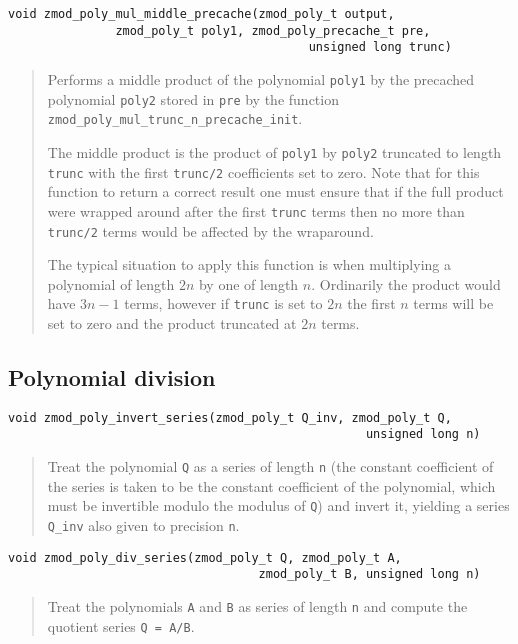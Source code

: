 \documentclass[a4paper,10pt]{article}
\newcommand{\code}{\lstinline}
\begin{document}
\begin{lstlisting}
void zmod_poly_mul_middle_precache(zmod_poly_t output,
               zmod_poly_t poly1, zmod_poly_precache_t pre,
                                          unsigned long trunc)
\end{lstlisting}
\begin{quote}
Performs a middle product of the polynomial \code{poly1} by the precached polynomial \code{poly2} stored in \code{pre} by the function \code{zmod_poly_mul_trunc_n_precache_init}. 

The middle product is the product of \code{poly1} by \code{poly2} truncated to length \code{trunc} with the first \code{trunc/2} coefficients set to zero. Note that for this function to return a correct result one must ensure that if the full product were wrapped around after the first \code{trunc} terms then no more than \code{trunc/2} terms would be affected by the wraparound. 

The typical situation to apply this function is when multiplying a polynomial of length $2n$ by one of length $n$. Ordinarily the product would have $3n - 1$ terms, however if \code{trunc} is set to $2n$ the first $n$ terms will be set to zero and the product truncated at $2n$ terms.  
\end{quote}

\subsection{Polynomial division}
\begin{lstlisting}
void zmod_poly_invert_series(zmod_poly_t Q_inv, zmod_poly_t Q, 
                                                  unsigned long n)
\end{lstlisting}
\begin{quote}
Treat the polynomial \code{Q} as a series of length \code{n} (the constant coefficient of the series is taken to be the constant coefficient of the polynomial, which must be invertible modulo the modulus of \code{Q}) and invert it, yielding a series \code{Q_inv} also given to precision \code{n}. 
\end{quote}

\begin{lstlisting}
void zmod_poly_div_series(zmod_poly_t Q, zmod_poly_t A, 
                                   zmod_poly_t B, unsigned long n)
\end{lstlisting}
\begin{quote}
Treat the polynomials \code{A} and \code{B} as series of length \code{n} and compute the quotient series \code{Q = A/B}.
\end{quote}
\end{document}
